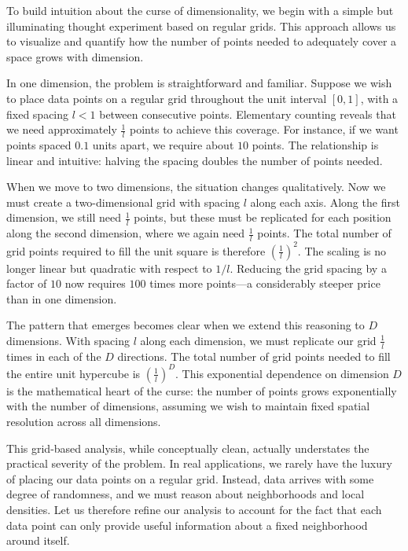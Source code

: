 To build intuition about the curse of dimensionality, we begin with a simple but illuminating thought experiment based on regular grids. This approach allows us to visualize and quantify how the number of points needed to adequately cover a space grows with dimension.

In one dimension, the problem is straightforward and familiar. Suppose we wish to place data points on a regular grid throughout the unit interval $[0,1]$, with a fixed spacing $l < 1$ between consecutive points. Elementary counting reveals that we need approximately $\frac{1}{l}$ points to achieve this coverage. For instance, if we want points spaced $0.1$ units apart, we require about $10$ points. The relationship is linear and intuitive: halving the spacing doubles the number of points needed.

When we move to two dimensions, the situation changes qualitatively. Now we must create a two-dimensional grid with spacing $l$ along each axis. Along the first dimension, we still need $\frac{1}{l}$ points, but these must be replicated for each position along the second dimension, where we again need $\frac{1}{l}$ points. The total number of grid points required to fill the unit square is therefore $\left(\frac{1}{l}\right)^2$. The scaling is no longer linear but quadratic with respect to $1/l$. Reducing the grid spacing by a factor of $10$ now requires $100$ times more points—a considerably steeper price than in one dimension.

The pattern that emerges becomes clear when we extend this reasoning to $D$ dimensions. With spacing $l$ along each dimension, we must replicate our grid $\frac{1}{l}$ times in each of the $D$ directions. The total number of grid points needed to fill the entire unit hypercube is $\left(\frac{1}{l}\right)^D$. This exponential dependence on dimension $D$ is the mathematical heart of the curse: the number of points grows exponentially with the number of dimensions, assuming we wish to maintain fixed spatial resolution across all dimensions.

This grid-based analysis, while conceptually clean, actually understates the practical severity of the problem. In real applications, we rarely have the luxury of placing our data points on a regular grid. Instead, data arrives with some degree of randomness, and we must reason about neighborhoods and local densities. Let us therefore refine our analysis to account for the fact that each data point can only provide useful information about a fixed neighborhood around itself.

